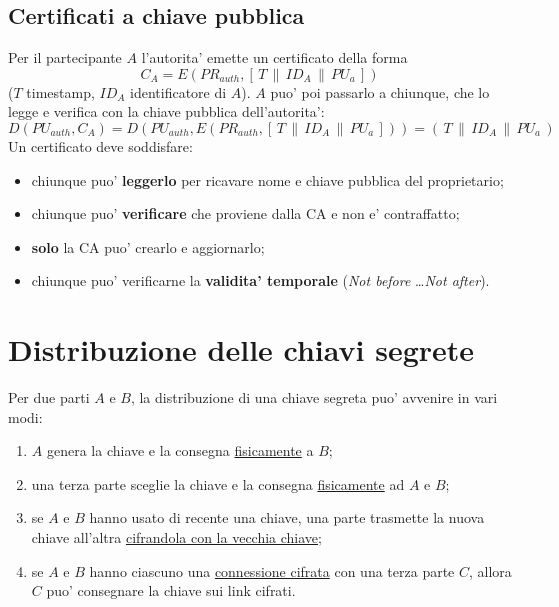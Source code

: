 \subsection{Certificati a chiave pubblica}
Per il partecipante $ A $ l'autorita' emette un certificato della forma
\[
  C_A = E(PR_{auth}, [\, T \,\|\, ID_A \,\|\, PU_a \,])
\]
($ T $ timestamp, $ ID_A $ identificatore di $ A $). $ A $ puo' poi passarlo a chiunque, che lo legge e verifica con la chiave pubblica dell'autorita':
\[
  D(PU_{auth}, C_A) = D(PU_{auth}, E(PR_{auth}, [\, T \,\|\, ID_A \,\|\, PU_a \,])) = (\, T \,\|\, ID_A \,\|\, PU_a \,)
\]
Un certificato deve soddisfare:
\begin{itemize}
  \item chiunque puo' \textbf{leggerlo} per ricavare nome e chiave pubblica del proprietario;
  \item chiunque puo' \textbf{verificare} che proviene dalla CA e non e' contraffatto;
  \item \textbf{solo} la CA puo' crearlo e aggiornarlo;
  \item chiunque puo' verificarne la \textbf{validita' temporale} (\textit{Not before} \dots \textit{Not after}).
\end{itemize}

\section{Distribuzione delle chiavi segrete}
Per due parti $ A $ e $ B $, la distribuzione di una chiave segreta puo' avvenire in vari modi:
\begin{enumerate}
  \item $ A $ genera la chiave e la consegna \underline{fisicamente} a $ B $;
  \item una terza parte sceglie la chiave e la consegna \underline{fisicamente} ad $ A $ e $ B $;
  \item se $ A $ e $ B $ hanno usato di recente una chiave, una parte trasmette la nuova chiave all'altra \underline{cifrandola con la vecchia chiave};
  \item se $ A $ e $ B $ hanno ciascuno una \underline{connessione cifrata} con una terza parte $ C $, allora $ C $ puo' consegnare la chiave sui link cifrati.
\end{enumerate}

